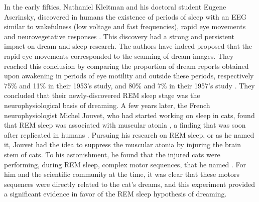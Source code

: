 In the early fifties, Nathaniel Kleitman and his doctoral student Eugene Aserinsky, discovered in humans the existence of periods of sleep with an EEG similar to wakefulness (low voltage and fast frequencies), rapid eye movements and neurovegetative responses \citep{aserinsky_regularly_1953}. This discovery had a strong and persistent impact on dream and sleep research. The authors have indeed proposed that the rapid eye movements corresponded to the scanning of dream images. They reached this conclusion by comparing the proportion of dream reports obtained upon awakening in periods of eye motility and outside these periods, respectively 75\% and 11\% in their 1953’s study, and 80\% and 7\% in their 1957's study \citep{dement_relation_1957}. They concluded that their newly-discovered REM sleep stage was the neurophysiological basis of dreaming. A few years later, the French neurophysiologist Michel Jouvet, who had started working on sleep in cats, found that REM sleep was associated with muscular atonia \citep{jouvet_sur_1959}, a finding that was soon after replicated in humans \citep{berger_tonus_1961}. Pursuing his research on REM sleep, or  as he named it, Jouvet had the idea to suppress the muscular atonia by injuring the brain stem of cats. To his astonishment, he found that the injured cats were performing, during REM sleep, complex motor sequences, that he named  \citep{sastre_comportement_1979}. For him and the scientific community at the time, it was clear that these motors sequences were directly related to the cat's dreams, and this experiment provided a significant evidence in favor of the REM sleep hypothesis of dreaming.

